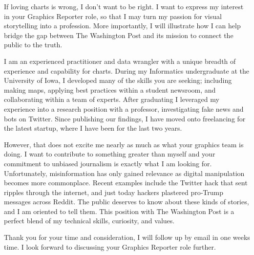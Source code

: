 \begin{cvletter}
  If loving charts is wrong, I don’t want to be right.
  I want to express my interest in your Graphics Reporter role, so that I may turn my passion for visual storytelling into a profession.
  More importantly, I will illustrate how I can help bridge the gap between The Washington Post and its mission to connect the public to the truth.

  I am an experienced practitioner and data wrangler with a unique breadth of experience and capability for charts.
  During my Informatics undergraduate at the University of Iowa, I developed many of the skills you are seeking; including making maps, applying best practices within a student newsroom, and collaborating within a team of experts.
  After graduating I leveraged my experience into a research position with a professor, investigating fake news and bots on Twitter.
  Since publishing our findings, I have moved onto freelancing for the latest startup, where I have been for the last two years.

  However, that does not excite me nearly as much as what your graphics team is doing.
  I want to contribute to something greater than myself and your commitment to unbiased journalism is exactly what I am looking for.
  Unfortunately, misinformation has only gained relevance as digital manipulation becomes more commonplace.
  Recent examples include the Twitter hack that sent ripples through the internet, and just today hackers plastered pro‐Trump messages across Reddit.
  The public deserves to know about these kinds of stories, and I am oriented to tell them.
  This position with The Washington Post is a perfect blend of my technical skills, curiosity, and values.

  Thank you for your time and consideration, I will follow up by email in one weeks time.
  I look forward to discussing your Graphics Reporter role further.
\end{cvletter}
